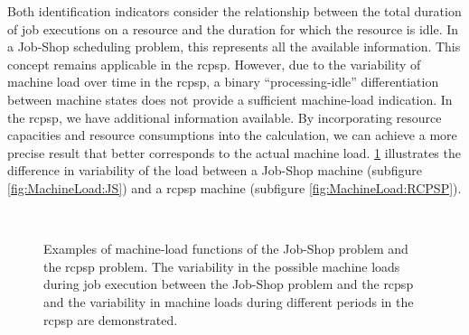 Both identification indicators consider the relationship between the total duration
of job executions on a resource and the duration for which the resource is idle.
In a Job-Shop scheduling problem,
this represents all the available information.
This concept remains applicable in the \ac{rcpsp}.
However, due to the variability of machine load over time in the \ac{rcpsp},
a binary \enquote{processing-idle} differentiation between machine states
does not provide a sufficient machine-load indication.
In the \ac{rcpsp}, we have additional information available.
By incorporating resource capacities and resource consumptions into the calculation,
we can achieve a more precise result that better corresponds to the actual machine load.
\cref{fig:MachineLoad} illustrates the difference in variability of the load between
a Job-Shop machine (subfigure \ref{fig:MachineLoad:JS})
and a \ac{rcpsp} machine (subfigure \ref{fig:MachineLoad:RCPSP}).

\begin{figure}[t]
    \centering
    
    \\
    
    \caption{
        Examples of machine-load functions of the Job-Shop problem and the \ac{rcpsp} problem.
        The variability in the possible machine loads during job execution
        between the Job-Shop problem and the \ac{rcpsp}
        and the variability in machine loads during different periods in the \ac{rcpsp} are demonstrated.
        }
    \label{fig:MachineLoad}
\end{figure}

